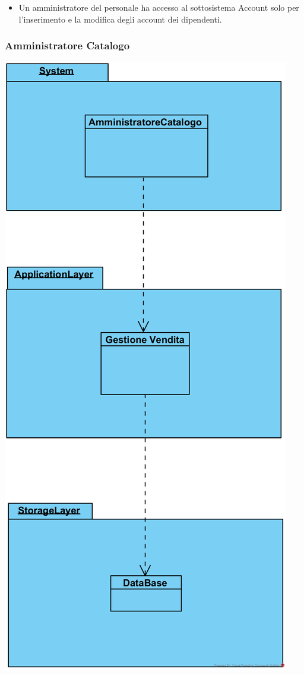\documentclass[12pt,a4paper]{article}
\begin{document}
\begin{itemize}
\item Un amministratore del personale ha accesso al sottosistema Account solo per l'inserimento e la modifica degli account dei dipendenti.
\end{itemize}

\subsubsection{Amministratore Catalogo}
\begin{center}
\includegraphics[height=0.34\textheight]{AmministratoreCatalogo}
\end{center}
\end{document}
